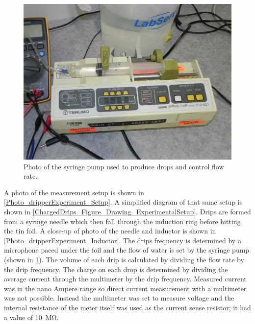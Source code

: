     \begin{figure}[ht]
        \centering
        \includegraphics[scale=0.15]{content/appendices/chargedWaterDrops/graphics/Photo_dripperExperiment_SyringePump_draft.JPG}
        \caption{\label{Photo_dripperExperiment_SyringePump}Photo of the syringe pump used to produce drops and control flow rate.}
    \end{figure}
  
    A photo of the measurement setup is shown in \cref{Photo_dripperExperiment_Setup}.
    A simplified diagram of that same setup is shown in \cref{ChargedDrips_Figure_Drawing_ExperimentalSetup}.
    Drips are formed from a syringe needle which then fall through the induction ring before hitting the tin foil.
    A close-up of photo of the needle and inductor is shown in \cref{Photo_dripperExperiment_Inductor}.
    The drips frequency is determined by a microphone paced under the foil and the flow of water is set by the syringe pump (shown in \cref{Photo_dripperExperiment_SyringePump}). 
    The volume of each drip is calculated by dividing the flow rate by the drip frequency.
    The charge on each drop is determined by dividing the average current through the multimeter by the drip frequency.
    Measured current was in the nano Ampere range so direct current measurement with a multimeter was not possible.
    Instead the multimeter was set to measure voltage and the internal resistance of the meter itself was used as the current sense resistor; it had a value of \SI{10}{\mega\ohm}.
%    
    

